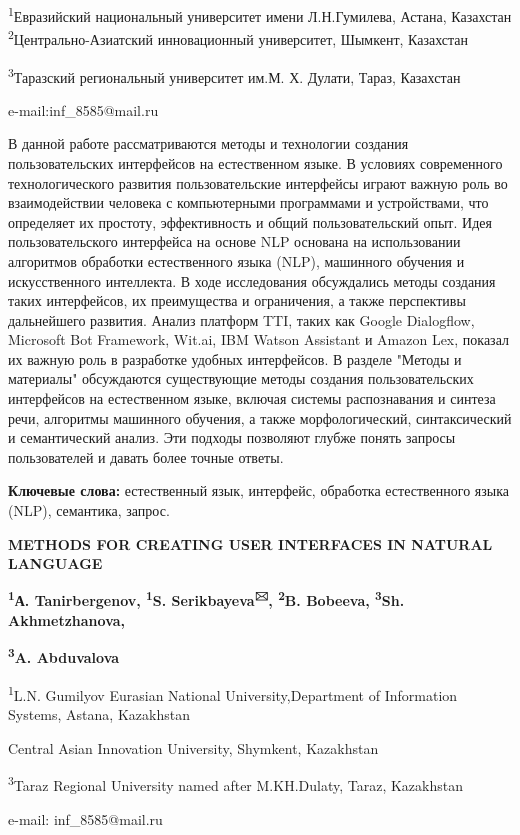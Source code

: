 \textsuperscript{1}Евразийский национальный университет имени
Л.Н.Гумилева, Астана, Казахстан \textsuperscript{2}Центрально-Азиатский
инновационный университет, Шымкент, Казахстан

\textsuperscript{3}Таразский региональный университет им.М. Х. Дулати,
Тараз, Казахстан

e-mail:inf\_8585@mail.ru

В данной работе рассматриваются методы и технологии создания
пользовательских интерфейсов на естественном языке. В условиях
современного технологического развития пользовательские интерфейсы
играют важную роль во взаимодействии человека с компьютерными
программами и устройствами, что определяет их простоту, эффективность и
общий пользовательский опыт. Идея пользовательского интерфейса на основе
NLP основана на использовании алгоритмов обработки естественного языка
(NLP), машинного обучения и искусственного интеллекта. В ходе
исследования обсуждались методы создания таких интерфейсов, их
преимущества и ограничения, а также перспективы дальнейшего развития.
Анализ платформ TTI, таких как Google Dialogflow, Microsoft Bot
Framework, Wit.ai, IBM Watson Assistant и Amazon Lex, показал их важную
роль в разработке удобных интерфейсов. В разделе "Методы и материалы"
обсуждаются существующие методы создания пользовательских интерфейсов на
естественном языке, включая системы распознавания и синтеза речи,
алгоритмы машинного обучения, а также морфологический, синтаксический и
семантический анализ. Эти подходы позволяют глубже понять запросы
пользователей и давать более точные ответы.

{\bfseries Ключевые слова:} естественный язык, интерфейс, обработка
естественного языка (NLP), семантика, запрос.

{\bfseries METHODS FOR CREATING USER INTERFACES IN NATURAL LANGUAGE}

{\bfseries \textsuperscript{1}А. Tanirbergenov, \textsuperscript{1}S.
Serikbayeva\textsuperscript{🖂}, \textsuperscript{2}B. Bobeeva,
\textsuperscript{3}Sh. Akhmetzhanova,}

{\bfseries \textsuperscript{3}A. Abduvalova}

\textsuperscript{1}L.N. Gumilyov Eurasian National University,Department
of Information Systems, Astana, Kazakhstan

Central Asian Innovation University, Shymkent, Kazakhstan

\textsuperscript{3}Taraz Regional University named after M.KH.Dulaty,
Taraz, Kazakhstan

e-mail: inf\_8585@mail.ru

